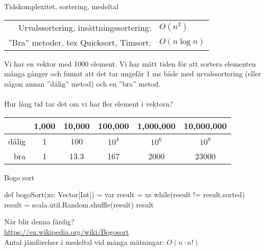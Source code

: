 \begin{Slide}{Tidskomplexitet, sortering, medeltal}
\begin{tabular}{rl}
Urvalssortering, insättningssortering: & $O(n^2)$ \\
''Bra'' metoder, tex Quicksort, Timsort:  & $O(n\log n)$
\end{tabular}

\vspace{1em}\SlideFontSmall\noindent
Vi har en vektor med 1000 element. Vi har mätt tiden för att sortera elementen många gånger och funnit att det tar ungefär 1 ms både med urvalssortering (eller någon annan ''dålig'' metod) och en ''bra'' metod. \\~\\ Hur lång tid tar det om vi har fler element i vektorn?

\vspace{1em}
\begin{tabular}{rccccc}
       & 1,000 & 10,000 & 100,000 & 1,000,000 & 10,000,000 \\ \hline
dålig  & 1     & 100    & $10^4$  & $10^6$   & $10^8$ \\
bra    & 1     & 13.3   & 167     & 2000     & 23000
\end{tabular}
\end{Slide}

\begin{Slide}{Bogo sort}
\begin{Code}
def bogoSort(xs: Vector[Int]) = {
  var result = xs
  while(result != result.sorted) {
    result = scala.util.Random.shuffle(result)
  }
  result
}
\end{Code}
När blir denna färdig? \pause \\
\url{https://en.wikipedia.org/wiki/Bogosort}\\
Antal jämförelser i medeltal vid många mätningar: $ O(n \cdot n!) $
\end{Slide}





